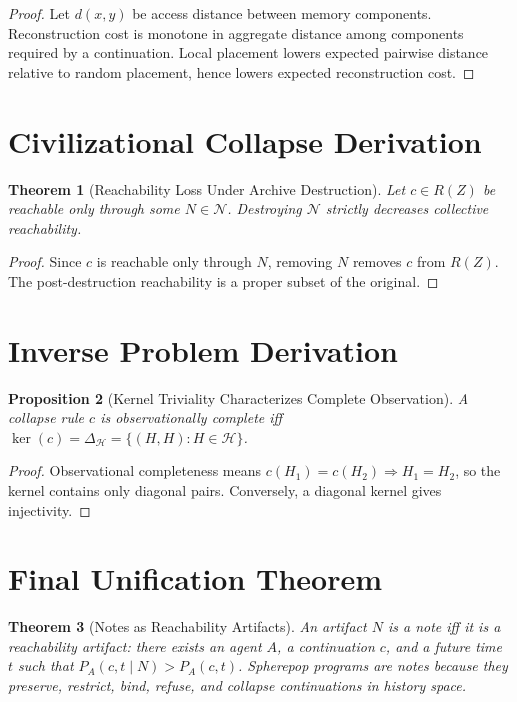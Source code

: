 \documentclass[12pt, a4paper, openany]{book}
\theoremstyle{plain}
\newtheorem{theorem}{Theorem}[chapter]
\newtheorem{proposition}[theorem]{Proposition}
\theoremstyle{definition}
\theoremstyle{remark}
\newcommand{\calH}{\mathcal{H}}
\newcommand{\calN}{\mathcal{N}}
\begin{document}
\begin{proof}
Let $d(x, y)$ be access distance between memory components. Reconstruction cost
is monotone in aggregate distance among components required by a continuation.
Local placement lowers expected pairwise distance relative to random placement,
hence lowers expected reconstruction cost.
\end{proof}

\section{Civilizational Collapse Derivation}

\begin{theorem}[Reachability Loss Under Archive Destruction]
Let $c \in R(Z)$ be reachable only through some $N \in \calN$. Destroying $\calN$
strictly decreases collective reachability.
\end{theorem}

\begin{proof}
Since $c$ is reachable only through $N$, removing $N$ removes $c$ from $R(Z)$.
The post-destruction reachability is a proper subset of the original.
\end{proof}

\section{Inverse Problem Derivation}

\begin{proposition}[Kernel Triviality Characterizes Complete Observation]
A collapse rule $c$ is observationally complete iff
$\ker(c) = \Delta_\calH = \{(H, H) : H \in \calH\}$.
\end{proposition}

\begin{proof}
Observational completeness means $c(H_1) = c(H_2) \Rightarrow H_1 = H_2$, so
the kernel contains only diagonal pairs. Conversely, a diagonal kernel gives
injectivity.
\end{proof}

\section{Final Unification Theorem}

\begin{theorem}[Notes as Reachability Artifacts]
\label{thm:unification}
An artifact $N$ is a note iff it is a reachability artifact: there exists an
agent $A$, a continuation $c$, and a future time $t$ such that
$P_A(c, t \mid N) > P_A(c, t)$.
Spherepop programs are notes because they preserve, restrict, bind, refuse, and
collapse continuations in history space.
\end{theorem}
\end{document}
